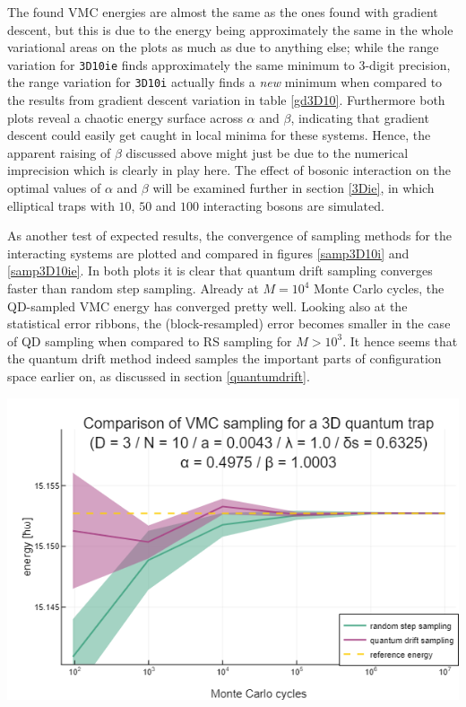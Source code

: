\documentclass[a4paper,8pt]{article}
\begin{document}
\begin{multicols}{2}
The found VMC energies are almost the same as the ones found with gradient descent, but this is due to the energy being approximately the same in the whole variational areas on the plots as much as due to anything else; while the range variation for \texttt{3D10ie} finds approximately the same minimum to 3-digit precision, the range variation for \texttt{3D10i} actually finds a \textit{new} minimum when compared to the results from gradient descent variation in table \ref{gd3D10}. Furthermore both plots reveal a chaotic energy surface across $\alpha$ and $\beta$, indicating that gradient descent could easily get caught in local minima for these systems. Hence, the apparent raising of $\beta$ discussed above might just be due to the numerical imprecision which is clearly in play here. The effect of bosonic interaction on the optimal values of $\alpha$ and $\beta$ will be examined further in section \ref{3Die}, in which elliptical traps with $10$, $50$ and $100$ interacting bosons are simulated.

As another test of expected results, the convergence of sampling methods for the interacting systems are plotted and compared in figures \ref{samp3D10i} and \ref{samp3D10ie}. In both plots it is clear that quantum drift sampling converges faster than random step sampling. Already at ${M = 10^4}$ Monte Carlo cycles, the QD-sampled VMC energy has converged pretty well. Looking also at the statistical error ribbons, the (block-resampled) error becomes smaller in the case of QD sampling when compared to RS sampling for $M > 10^3$. It hence seems that the quantum drift method indeed samples the important parts of configuration space earlier on, as discussed in section \ref{quantumdrift}.

\begin{center}
\includegraphics[width=0.9\columnwidth]{fig3D10i_sampling}
\label{samp3D10i}
\end{center}


\end{multicols}
\end{document}
